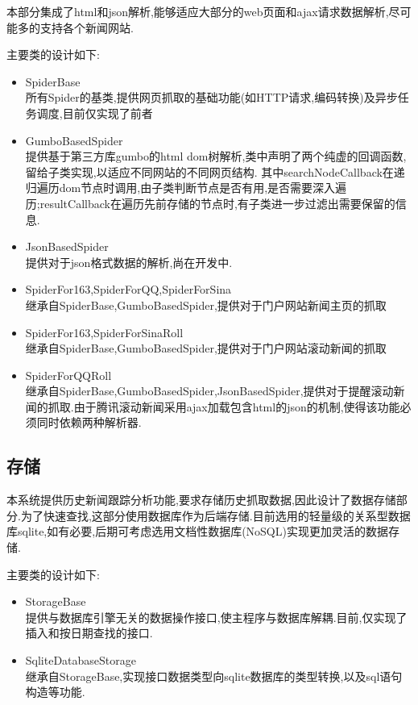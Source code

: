 \documentclass[12pt]{article}
\begin{document}
本部分集成了html和json解析,能够适应大部分的web页面和ajax请求数据解析,尽可能多的支持各个新闻网站.

主要类的设计如下:

\begin{itemize}
\item SpiderBase\\
所有Spider的基类,提供网页抓取的基础功能(如HTTP请求,编码转换)及异步任务调度,目前仅实现了前者

\item GumboBasedSpider\\
提供基于第三方库gumbo的html dom树解析,类中声明了两个纯虚的回调函数,留给子类实现,以适应不同网站的不同网页结构.
其中searchNodeCallback在递归遍历dom节点时调用,由子类判断节点是否有用,是否需要深入遍历;resultCallback在遍历先前存储的节点时,有子类进一步过滤出需要保留的信息.

\item JsonBasedSpider\\
提供对于json格式数据的解析,尚在开发中.

\item SpiderFor163,SpiderForQQ,SpiderForSina\\
继承自SpiderBase,GumboBasedSpider,提供对于门户网站新闻主页的抓取

\item SpiderFor163,SpiderForSinaRoll\\
继承自SpiderBase,GumboBasedSpider,提供对于门户网站滚动新闻的抓取

\item SpiderForQQRoll\\
继承自SpiderBase,GumboBasedSpider,JsonBasedSpider,提供对于提醒滚动新闻的抓取.由于腾讯滚动新闻采用ajax加载包含html的json的机制,使得该功能必须同时依赖两种解析器.
\end{itemize}

\subsection{存储}
本系统提供历史新闻跟踪分析功能,要求存储历史抓取数据,因此设计了数据存储部分.为了快速查找,这部分使用数据库作为后端存储.目前选用的轻量级的关系型数据库sqlite,如有必要,后期可考虑选用文档性数据库(NoSQL)实现更加灵活的数据存储.

主要类的设计如下:

\begin{itemize}
\item StorageBase\\
提供与数据库引擎无关的数据操作接口,使主程序与数据库解耦.目前,仅实现了插入和按日期查找的接口.

\item SqliteDatabaseStorage\\
继承自StorageBase,实现接口数据类型向sqlite数据库的类型转换,以及sql语句构造等功能.
\end{itemize}
\end{document}
